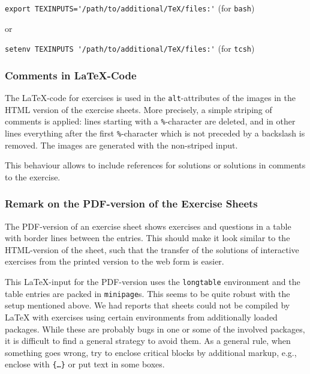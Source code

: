 \documentclass[12pt,openany,a4paper]{book}
\begin{document}
\hspace*{5mm} \verb!export TEXINPUTS='/path/to/additional/TeX/files:'!
\hspace*{5mm} (for \texttt{bash})

or

\hspace*{5mm} \verb!setenv TEXINPUTS '/path/to/additional/TeX/files:'!
\hspace*{5mm} (for \texttt{tcsh})

\subsubsection*{Comments in \LaTeX-Code}

The \LaTeX-code for exercises is used in the
\texttt{alt}-attributes of the images in the HTML version of the exercise
sheets. More precisely, a simple striping of comments is applied: lines
starting with a \texttt{\%}-character are deleted, and in other lines
everything after the first \texttt{\%}-character which is not preceded by
a backslash is removed. The images are generated with the non-striped input.

This behaviour allows to include references for solutions or solutions in
comments to the exercise.



\subsubsection*{Remark on the PDF-version of the Exercise Sheets}

The PDF-version of an exercise sheet shows exercises and questions in a
table with border lines between the entries. This should make it look
similar to the HTML-version of the sheet, such that the transfer of the
solutions of interactive exercises from the printed version to the web form
is easier.

This \LaTeX-input for the PDF-version uses the \texttt{longtable}
environment and the table entries are packed in \texttt{minipage}s. This
seems to be quite robust with the setup mentioned above. We had reports that 
sheets could not be compiled by {\LaTeX} with exercises using certain
environments from additionally loaded packages. While these are probably
bugs in one or some of the involved packages, it is difficult to find a
general strategy to avoid them. As a general rule, when something goes
wrong, try to enclose critical blocks by additional markup, e.g.,
enclose with \texttt{\{\ldots\}} or put text in some boxes.
\end{document}
